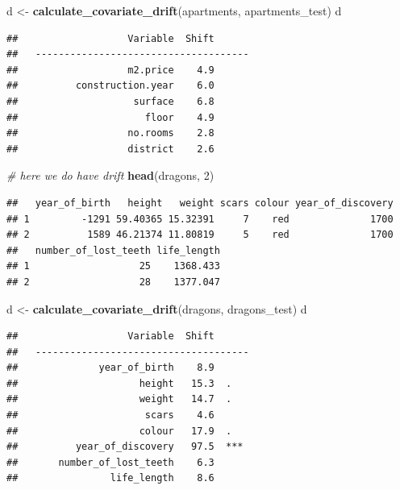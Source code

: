 \documentclass[12pt,]{krantz}
\newenvironment{Shaded}{\begin{snugshade}}{\end{snugshade}}
\newcommand{\CommentTok}[1]{\textcolor[rgb]{0.56,0.35,0.01}{\textit{#1}}}
\newcommand{\DecValTok}[1]{\textcolor[rgb]{0.00,0.00,0.81}{#1}}
\newcommand{\KeywordTok}[1]{\textcolor[rgb]{0.13,0.29,0.53}{\textbf{#1}}}
\newcommand{\NormalTok}[1]{#1}
\newcommand{\StringTok}[1]{\textcolor[rgb]{0.31,0.60,0.02}{#1}}
\begin{document}
\begin{Shaded}
\begin{Highlighting}[]
\NormalTok{d <-}\StringTok{ }\KeywordTok{calculate_covariate_drift}\NormalTok{(apartments, apartments_test)}
\NormalTok{d}
\end{Highlighting}
\end{Shaded}

\begin{verbatim}
##                   Variable  Shift
##   -------------------------------------
##                   m2.price    4.9  
##          construction.year    6.0  
##                    surface    6.8  
##                      floor    4.9  
##                   no.rooms    2.8  
##                   district    2.6
\end{verbatim}

\begin{Shaded}
\begin{Highlighting}[]
\CommentTok{# here we do have drift}
\KeywordTok{head}\NormalTok{(dragons, }\DecValTok{2}\NormalTok{)}
\end{Highlighting}
\end{Shaded}

\begin{verbatim}
##   year_of_birth   height   weight scars colour year_of_discovery
## 1         -1291 59.40365 15.32391     7    red              1700
## 2          1589 46.21374 11.80819     5    red              1700
##   number_of_lost_teeth life_length
## 1                   25    1368.433
## 2                   28    1377.047
\end{verbatim}

\begin{Shaded}
\begin{Highlighting}[]
\NormalTok{d <-}\StringTok{ }\KeywordTok{calculate_covariate_drift}\NormalTok{(dragons, dragons_test)}
\NormalTok{d}
\end{Highlighting}
\end{Shaded}

\begin{verbatim}
##                   Variable  Shift
##   -------------------------------------
##              year_of_birth    8.9  
##                     height   15.3  .
##                     weight   14.7  .
##                      scars    4.6  
##                     colour   17.9  .
##          year_of_discovery   97.5  ***
##       number_of_lost_teeth    6.3  
##                life_length    8.6
\end{verbatim}
\end{document}

